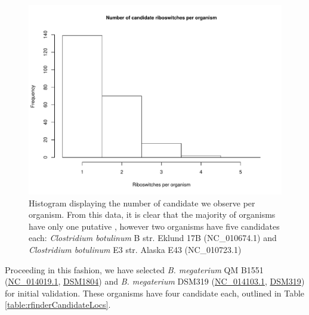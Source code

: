 \begin{figure}[!ht]
\centering
\includegraphics[width=.9\textwidth]{Figures/Ribofinder/candidateHistogramGroupedByAccession.pdf}
\caption[Histogram displaying the number of candidate \rbs we observe
per organism]{Histogram displaying the number of candidate \rbs we observe
per organism. From this data, it is clear that the majority of organisms have
only one putative \rb, however two organisms have five candidates each:
{\em Clostridium botulinum} B str. Eklund 17B (NC\_010674.1) and
{\em Clostridium botulinum} E3 str. Alaska E43 (NC\_010723.1)}
\label{fig:rfinder:candidateHistogramGroupedByAccession}
\end{figure}

Proceeding in this fashion, we have selected {\em B. megaterium} QM B1551
(\href{http://www.ncbi.nlm.nih.gov/nuccore/NC_014019.1}{NC\_014019.1},
\href{http://www.dsmz.de/catalogues/details/culture/DSM-1804.html}{DSM1804})
and {\em B. megaterium} DSM319
(\href{http://www.ncbi.nlm.nih.gov/nuccore/NC_014103.1}{NC\_014103.1},
\href{http://www.dsmz.de/catalogues/details/culture/DSM-319.html}{DSM319})
for initial validation. These organisms have four
candidate \grbs each, outlined in Table \ref{table:rfinderCandidateLocs}.

